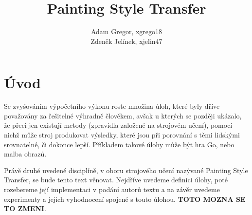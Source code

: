 \documentclass[twocolumn]{article}
\title{\Huge Painting Style Transfer}
\author{Adam Gregor, xgrego18 \\
	Zdeněk Jelínek, xjelin47
}
\begin{document}
	\maketitle
	
	\section*{Úvod}
	Se zvyšováním výpočetního výkonu roste množina úloh, které byly dříve považovány za řešitelné výhradně člověkem, avšak u kterých se později ukázalo, že přeci jen existují metody (zpravidla založené na strojovém učení), pomocí nichž může stroj produkovat výsledky, které jsou při porovnání s těmi lidskými srovnatelné, či dokonce lepší. Příkladem takové úlohy může být hra Go, nebo malba obrazů. 
	\par
	Právě druhé uvedené disciplíně, v oboru strojového učení nazývané Painting Style Transfer, se bude tento text věnovat. Nejdříve uvedeme definici úlohy, poté rozebereme její implementaci v podání autorů textu a na závěr uvedeme experimenty a jejich vyhodnocení spojené s touto úlohou. \textbf{TOTO MOZNA SE TO ZMENI}.
	
\end{document}
